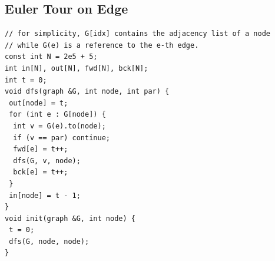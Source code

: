 \documentclass[a4paper,11pt,oneside]{article}
\begin{document}
\begin{multicols*}{\COLS}
\subsection{Euler Tour on Edge}
\begin{lstlisting}
// for simplicity, G[idx] contains the adjacency list of a node
// while G(e) is a reference to the e-th edge.
const int N = 2e5 + 5;
int in[N], out[N], fwd[N], bck[N];
int t = 0;
void dfs(graph &G, int node, int par) {
 out[node] = t;
 for (int e : G[node]) {
  int v = G(e).to(node);
  if (v == par) continue;
  fwd[e] = t++;
  dfs(G, v, node);
  bck[e] = t++;
 }
 in[node] = t - 1;
}
void init(graph &G, int node) {
 t = 0;
 dfs(G, node, node);
}
\end{lstlisting}




\end{multicols*}
\end{document}
